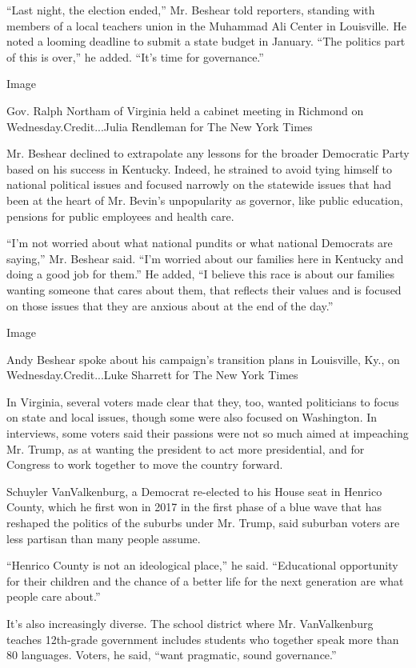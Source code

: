 ``Last night, the election ended,'' Mr. Beshear told reporters, standing
with members of a local teachers union in the Muhammad Ali Center in
Louisville. He noted a looming deadline to submit a state budget in
January. ``The politics part of this is over,'' he added. ``It's time
for governance.''

Image

Gov. Ralph Northam of Virginia held a cabinet meeting in Richmond on
Wednesday.Credit...Julia Rendleman for The New York Times

Mr. Beshear declined to extrapolate any lessons for the broader
Democratic Party based on his success in Kentucky. Indeed, he strained
to avoid tying himself to national political issues and focused narrowly
on the statewide issues that had been at the heart of Mr. Bevin's
unpopularity as governor, like public education, pensions for public
employees and health care.

``I'm not worried about what national pundits or what national Democrats
are saying,'' Mr. Beshear said. ``I'm worried about our families here in
Kentucky and doing a good job for them.'' He added, ``I believe this
race is about our families wanting someone that cares about them, that
reflects their values and is focused on those issues that they are
anxious about at the end of the day.''

Image

Andy Beshear spoke about his campaign's transition plans in Louisville,
Ky., on Wednesday.Credit...Luke Sharrett for The New York Times

In Virginia, several voters made clear that they, too, wanted
politicians to focus on state and local issues, though some were also
focused on Washington. In interviews, some voters said their passions
were not so much aimed at impeaching Mr. Trump, as at wanting the
president to act more presidential, and for Congress to work together to
move the country forward.

Schuyler VanValkenburg, a Democrat re-elected to his House seat in
Henrico County, which he first won in 2017 in the first phase of a blue
wave that has reshaped the politics of the suburbs under Mr. Trump, said
suburban voters are less partisan than many people assume.

``Henrico County is not an ideological place,'' he said. ``Educational
opportunity for their children and the chance of a better life for the
next generation are what people care about.''

It's also increasingly diverse. The school district where Mr.
VanValkenburg teaches 12th-grade government includes students who
together speak more than 80 languages. Voters, he said, ``want
pragmatic, sound governance.''

